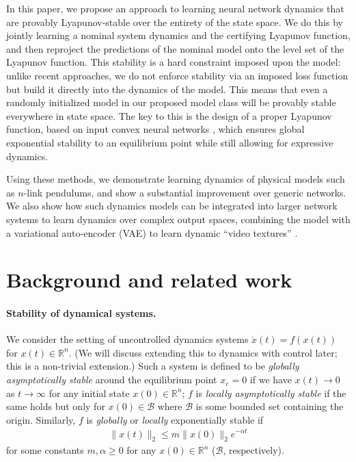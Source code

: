In this paper, we propose an approach to learning neural network dynamics that are provably Lyapunov-stable over the entirety of the state space. We do this by jointly learning a nominal system dynamics and the certifying Lyapunov function, and then reproject the predictions of the nominal model onto the level set of the Lyapunov function. This stability is a hard constraint imposed upon the model: unlike recent approaches, we do not enforce stability via an imposed loss function but build it directly into the dynamics of the model. This means that even a randomly initialized model in our proposed model class will be provably stable everywhere in state space. The key to this is the design of a proper Lyapunov function, based on input convex neural networks \citep{amos2017input}, which ensures global exponential stability to an equilibrium point while still allowing for expressive dynamics.

Using these methods, we demonstrate learning dynamics of physical models such as $n$-link pendulums, and show a substantial improvement over generic networks.  We also show how such dynamics models can be integrated into larger network systems to learn dynamics over complex output spaces, combining the model with a variational auto-encoder (VAE) \citep{kingma2013auto} to learn dynamic ``video textures'' \citep{schodl2000video}.

\section{Background and related work}

\paragraph{Stability of dynamical systems.} We consider the setting of uncontrolled dynamics systems $\dot{x}(t) = f(x(t))$ for $x(t) \in \mathbb{R}^n$. (We will discuss extending this to dynamics with control later; this is a non-trivial extension.) Such a system is defined to be \emph{globally asymptotically stable} around the equilibrium point $x_e=0$ if we have $x(t) \rightarrow 0$ as $t \rightarrow \infty$ for any initial state $x(0) \in \mathbb{R}^n$; $f$ is \emph{locally asymptotically stable} if the same holds but only for $x(0) \in \mathcal B$ where $\mathcal B$ is some bounded set containing the origin.  Similarly, $f$ is \emph{globally} or \emph{locally} exponentially stable if
\begin{align}
	\|x(t)\|_2 \leq m \|x(0)\|_2 e^{-\alpha t}
\end{align}
for some constants $m, \alpha \geq 0$ for any $x(0) \in \mathbb{R}^n$ ($\mathcal B$, respectively).

